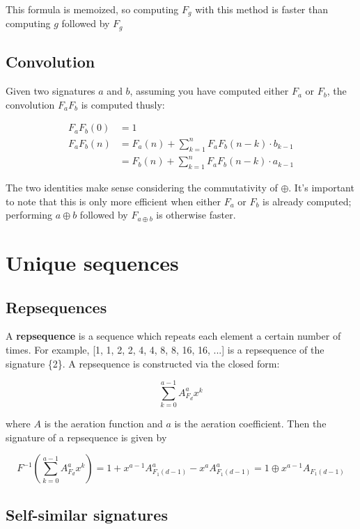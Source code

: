 \documentclass{article}
\begin{document}
\noindent This formula is memoized, so computing $F_g$ with this method is faster than computing $g$ followed by $F_g$\\

\subsection{Convolution}

Given two signatures $a$ and $b$, assuming you have computed either $F_a$ or $F_b$, the convolution $F_a F_b$ is computed thusly:

\begin{align*}
F_a F_b (0) &= 1\\
F_a F_b (n) &= F_a(n) + \sum_{k=1}^{n} F_a F_b (n-k) \cdot b_{k-1}\\
&= F_b(n) + \sum_{k=1}^{n} F_a F_b (n-k) \cdot a_{k-1}
\end{align*}

\noindent The two identities make sense considering the commutativity of $\oplus$. It's important to note that this is only more efficient when either $F_a$ or $F_b$ is already computed; performing $a \oplus b$ followed by $F_{a \oplus b}$ is otherwise faster.

\section{Unique sequences}

\subsection{Repsequences}

A \textbf{repsequence} is a sequence which repeats each element a certain number of times. For example, [1, 1, 2, 2, 4, 4, 8, 8, 16, 16, ...] is a repsequence of the signature \{2\}. A repsequence is constructed via the closed form:

$$\sum_{k=0}^{a-1} A_{F_d}^a x^k$$

\noindent where $A$ is the aeration function and $a$ is the aeration coefficient. Then the signature of a repsequence is given by

$$F^{-1} \left( \sum_{k=0}^{a-1} A_{F_d}^a x^k \right) = 1 + x^{a-1} A_{F_1 (d-1)}^a - x^a A_{F_1 (d-1)}^a = 1 \oplus x^{a-1} A_{F_1 (d-1)}$$

\subsection{Self-similar signatures}
\end{document}

